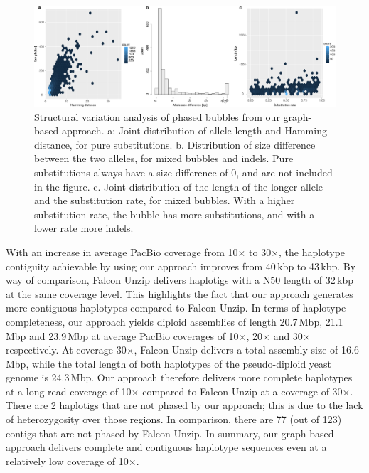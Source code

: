 \begin{figure}[t!]
\begin{center}
\includegraphics[width=\textwidth]{bubble-breakdown}%
\end{center}
\caption{Structural variation analysis of phased bubbles from our graph-based approach.
a: Joint distribution of allele length and Hamming distance, for pure substitutions.
b. Distribution of size difference between the two alleles, for mixed bubbles and indels. 
Pure substitutions always have a size difference of 0, and are not included in the figure.
c. Joint distribution of the length of the longer allele and the substitution rate, for mixed bubbles.
With a higher substitution rate, the bubble has more substitutions, and with a lower rate more indels.
}
\label{fig:bubble_breakdown}
\end{figure}
With an increase in average PacBio coverage from 10$\times$ to 30$\times$, the haplotype contiguity achievable by using our approach improves from 40\,kbp to 43\,kbp.
By way of comparison, Falcon Unzip delivers haplotigs with a N50 length of 32\,kbp at the same coverage level. This highlights the fact that our approach generates more contiguous haplotypes compared to Falcon Unzip.
In terms of haplotype completeness, our approach yields diploid assemblies of length 20.7\,Mbp, 21.1\,Mbp and 23.9\,Mbp at average PacBio coverages of 10$\times$, 20$\times$ and 30$\times$ respectively.
At coverage 30$\times$, Falcon Unzip delivers a total assembly size of 16.6\,Mbp, while the total length of both haplotypes of the pseudo-diploid yeast genome is 24.3\,Mbp.
Our approach therefore delivers more complete haplotypes at a long-read coverage of 10$\times$ compared to Falcon Unzip at a coverage of 30$\times$.
There are 2 haplotigs that are not phased by our approach; this is due to the lack of heterozygosity over those regions.
In comparison, there are 77 (out of 123) contigs that are not phased by Falcon Unzip.
In summary, our graph-based approach delivers complete and contiguous haplotype sequences even at a relatively low coverage of 10$\times$.

